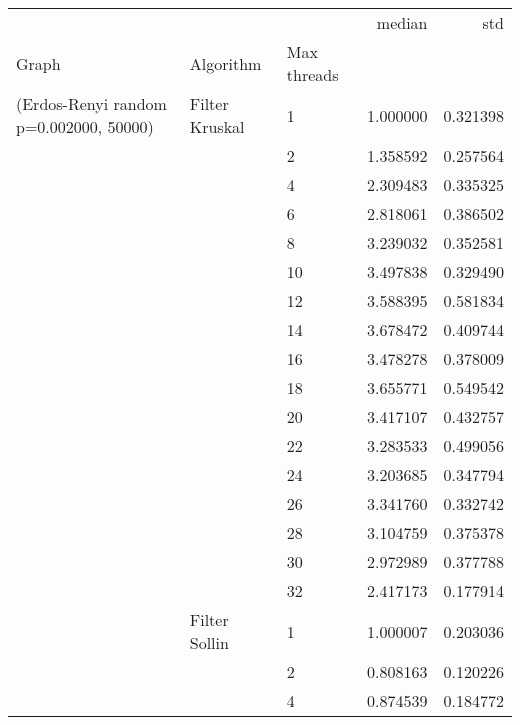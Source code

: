 \begin{tabular}{lllrr}
\toprule
                      &                     &    &    median &       std \\
Graph & Algorithm & Max threads &           &           \\
\midrule
(Erdos-Renyi random p=0.002000, 50000) & Filter Kruskal & 1  &  1.000000 &  0.321398 \\
                      &                     & 2  &  1.358592 &  0.257564 \\
                      &                     & 4  &  2.309483 &  0.335325 \\
                      &                     & 6  &  2.818061 &  0.386502 \\
                      &                     & 8  &  3.239032 &  0.352581 \\
                      &                     & 10 &  3.497838 &  0.329490 \\
                      &                     & 12 &  3.588395 &  0.581834 \\
                      &                     & 14 &  3.678472 &  0.409744 \\
                      &                     & 16 &  3.478278 &  0.378009 \\
                      &                     & 18 &  3.655771 &  0.549542 \\
                      &                     & 20 &  3.417107 &  0.432757 \\
                      &                     & 22 &  3.283533 &  0.499056 \\
                      &                     & 24 &  3.203685 &  0.347794 \\
                      &                     & 26 &  3.341760 &  0.332742 \\
                      &                     & 28 &  3.104759 &  0.375378 \\
                      &                     & 30 &  2.972989 &  0.377788 \\
                      &                     & 32 &  2.417173 &  0.177914 \\
                      & Filter Sollin & 1  &  1.000007 &  0.203036 \\
                      &                     & 2  &  0.808163 &  0.120226 \\
                      &                     & 4  &  0.874539 &  0.184772 \\

\end{tabular}
